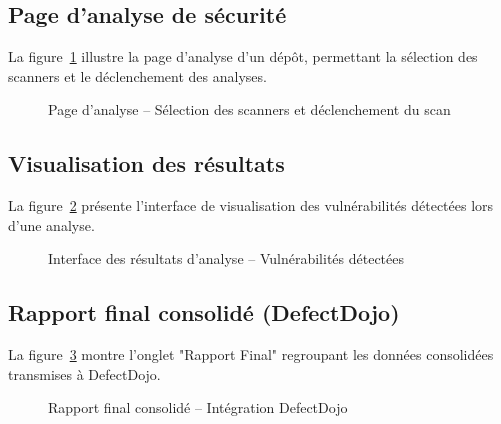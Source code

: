 \documentclass[12pt, a4paper, oneside]{report}
\begin{document}
\subsection{Page d'analyse de sécurité}

La figure~\ref{fig:ui_analysis} illustre la page d'analyse d'un dépôt,
permettant la sélection des scanners et le déclenchement des analyses.

\begin{figure}[H]
    \centering
    \caption{Page d'analyse -- Sélection des scanners et déclenchement du scan}
    \label{fig:ui_analysis}
\end{figure}

\subsection{Visualisation des résultats}

La figure~\ref{fig:ui_results} présente l'interface de visualisation des
vulnérabilités détectées lors d'une analyse.

\begin{figure}[H]
    \centering
    \caption{Interface des résultats d'analyse -- Vulnérabilités détectées}
    \label{fig:ui_results}
\end{figure}

\subsection{Rapport final consolidé (DefectDojo)}

La figure~\ref{fig:ui_rapport} montre l'onglet "Rapport Final" regroupant
les données consolidées transmises à DefectDojo.

\begin{figure}[H]
    \centering
    \caption{Rapport final consolidé -- Intégration DefectDojo}
    \label{fig:ui_rapport}
\end{figure}
\end{document}
